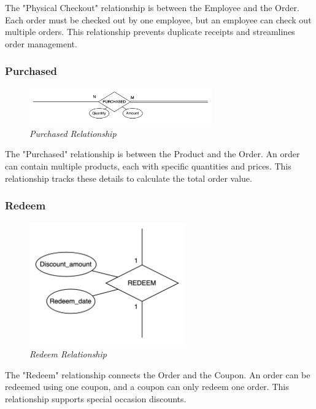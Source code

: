 The "Physical Checkout" relationship is between the Employee and the Order. Each order must be checked out by one employee, but an employee can check out multiple orders. This relationship prevents duplicate receipts and streamlines order management.

\subsubsection{Purchased}
\begin{figure}[H]
  \centering
  \includegraphics[width=0.7\textwidth]{images/relationships/purchased.png}
  \caption{\textit{Purchased Relationship}}
\end{figure}

The "Purchased" relationship is between the Product and the Order. An order can contain multiple products, each with specific quantities and prices. This relationship tracks these details to calculate the total order value.

\subsubsection{Redeem}
\begin{figure}[H]
  \centering
  \includegraphics[width=0.6\textwidth]{images/relationships/redeem.png}
  \caption{\textit{Redeem Relationship}}
\end{figure}

The "Redeem" relationship connects the Order and the Coupon. An order can be redeemed using one coupon, and a coupon can only redeem one order. This relationship supports special occasion discounts.


